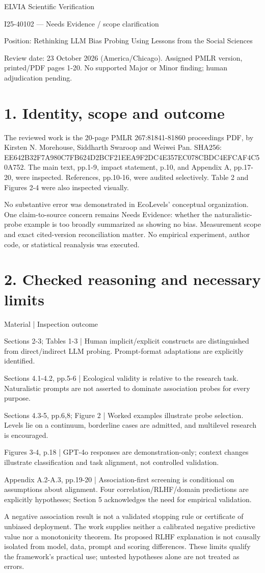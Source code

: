 \documentclass[10pt]{article}
\begin{document}
ELVIA Scientific Verification\par
I25-40102 — Needs Evidence / scope clarification\par
Position: Rethinking LLM Bias Probing Using Lessons from the Social Sciences\par
Review date: 23 October 2026 (America/Chicago). Assigned PMLR version, printed/PDF pages 1-20. No supported Major or Minor finding; human adjudication pending.\par
\section*{1. Identity, scope and outcome}
The reviewed work is the 20-page PMLR 267:81841-81860 proceedings PDF, by Kirsten N. Morehouse, Siddharth Swaroop and Weiwei Pan. SHA256: EE642B32F7A980C7FB624D2BCF21EEA9F2DC4E357EC078CBDC4EFCAF4C50A752. The main text, pp.1-9, impact statement, p.10, and Appendix A, pp.17-20, were inspected. References, pp.10-16, were audited selectively. Table 2 and Figures 2-4 were also inspected visually.\par
No substantive error was demonstrated in EcoLevels’ conceptual organization. One claim-to-source concern remains Needs Evidence: whether the naturalistic-probe example is too broadly summarized as showing no bias. Measurement scope and exact cited-version reconciliation matter. No empirical experiment, author code, or statistical reanalysis was executed.\par
\section*{2. Checked reasoning and necessary limits}
Material | Inspection outcome\par
Sections 2-3; Tables 1-3 | Human implicit/explicit constructs are distinguished from direct/indirect LLM probing. Prompt-format adaptations are explicitly identified.\par
Sections 4.1-4.2, pp.5-6 | Ecological validity is relative to the research task. Naturalistic prompts are not asserted to dominate association probes for every purpose.\par
Sections 4.3-5, pp.6,8; Figure 2 | Worked examples illustrate probe selection. Levels lie on a continuum, borderline cases are admitted, and multilevel research is encouraged.\par
Figures 3-4, p.18 | GPT-4o responses are demonstration-only; context changes illustrate classification and task alignment, not controlled validation.\par
Appendix A.2-A.3, pp.19-20 | Association-first screening is conditional on assumptions about alignment. Four correlation/RLHF/domain predictions are explicitly hypotheses; Section 5 acknowledges the need for empirical validation.\par
A negative association result is not a validated stopping rule or certificate of unbiased deployment. The work supplies neither a calibrated negative predictive value nor a monotonicity theorem. Its proposed RLHF explanation is not causally isolated from model, data, prompt and scoring differences. These limits qualify the framework’s practical use; untested hypotheses alone are not treated as errors.\par
\end{document}
